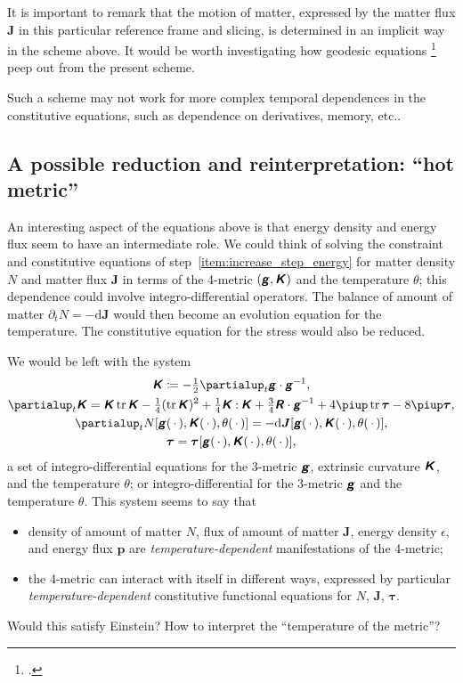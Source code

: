 \documentclass[\ifafour a4paper,12pt,\else a5paper,10pt,\fi%
onecolumn,oneside,article,%
british%
]{memoir}
\theoremstyle{remark}
\theoremstyle{innote}
\newcommand*{\mathte}[1]{\textbf{\textit{\textsf{#1}}}}
\newcommand*{\citep}{\footcites}
\newcommand*{\de}{\partialup}%
\newcommand*{\pu}{\piup}%
\newcommand*{\di}{\mathrm{d}}%
\DeclareMathOperator{\tr}{tr}%
\newcommand*{\defd}{\coloneqq}
\newcommand*{\dotv}{\mathord{\,\cdot\,}}%
\newcommand*{\con}{\mathbin{:}}%
\renewcommand*{\|}[1][]{\nonscript\,#1\vert\nonscript\;\mathopen{}}
\newcommand*{\etc}{{etc.}}
\newcommand*{\yd}{N}
\newcommand*{\yjj}{J}
\newcommand*{\yj}{\bm{\yjj}}
\newcommand*{\yTT}{\tau}
\newcommand*{\yT}{\bm{\yTT}}
\newcommand*{\ygg}{g}
\newcommand*{\yg}{\mathte{\ygg}}
\newcommand*{\yKK}{K}
\newcommand*{\yK}{\mathte{\yKK}}
\newcommand*{\yRR}{R}
\newcommand*{\yR}{\mathte{\yRR}}
\newcommand*{\ypp}{p}
\newcommand*{\yp}{\bm{\ypp}}
\newcommand*{\ye}{\epsilon}
\newcommand*{\yte}{\theta}
\begin{document}
It is important to remark that the motion of matter, expressed by the matter
flux $\yj$ in this particular reference frame and slicing, is determined in
an implicit way in the scheme above. It would be worth investigating how
geodesic equations \citep{gerochetal1975,weatherall2011} peep out from the
present scheme.

Such a scheme may not work for more complex temporal dependences in the
constitutive equations, such as dependence on derivatives, memory, \etc.

\subsection{A possible reduction and reinterpretation: \enquote{hot metric}}
\label{sec:reinterpretation_metric_temp}

An interesting aspect of the equations above is that energy density and
energy flux seem to have an intermediate role. We could think of solving
the constraint and constitutive equations of
step~\ref{item:increase_step_energy} for matter density $\yd$ and matter
flux $\yj$ in terms of the 4-metric $(\yg, \yK)$ and the temperature
$\yte$; this dependence could involve integro-differential operators. The
balance of amount of matter $\de_t\yd = -\di\yj$ would then become an
evolution equation for the temperature. The constitutive equation for the
stress would also be reduced.

We would be left with the system
\begin{subequations}\label{eq:evolution_eqns_new}
  \begin{gather}
    \label{eq:dt_metric_new}
    \yK \defd -\tfrac{1}{2}\de_t \yg \cdot \yg^{-1},
    \\
    \label{eq:dt_curvat_new}
    \de_t \yK =  \yK\tr\yK
                - \tfrac{1}{4} (\tr\yK)^2
                +\tfrac{1}{4}\yK\con\yK
                + \tfrac{3}{4}\yR\cdot\yg^{-1} 
                + 4\pu\tr\yT - 8\pu\yT,
    \\
    \label{eq:constit_mass_new}
    \de_t \yd[\yg(\dotv),\yK(\dotv),\yte(\dotv)] = -\di\yj[\yg(\dotv),\yK(\dotv),\yte(\dotv)],
    \\
    \label{eq:constit_T_new}
    \yT = \yT[\yg(\dotv),\yK(\dotv),\yte(\dotv)],
  \end{gather}
\end{subequations}
a set of integro-differential equations for the 3-metric $\yg$,
extrinsic curvature $\yK$, and the temperature $\yte$; or integro-differential for
the 3-metric $\yg$ and the temperature $\yte$. This system seems to say
that
\begin{itemize}
\item density of amount of matter $\yd$, flux of amount of matter $\yj$,
  energy density $\ye$, and energy flux $\yp$ are
  \emph{temperature-dependent} manifestations of the 4-metric;
\item the 4-metric can interact with itself in different ways, expressed by
  particular \emph{temperature-dependent} constitutive functional equations
  for $\yd$, $\yj$, $\yT$.
\end{itemize}
Would this satisfy Einstein? How to interpret the \enquote{temperature of
  the metric}?
\end{document}
